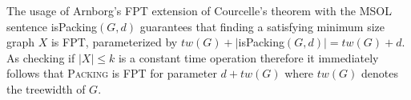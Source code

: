 \documentclass[10pt, a4paper]{article}
\theoremstyle{definition}
\newcommand{\mcO}{\mathcal{O}}
\begin{document}

The usage of Arnborg's FPT extension of Courcelle's theorem with the MSOL sentence isPacking$(G,d)$ guarantees that finding a satisfying minimum size graph $X$ is FPT, parameterized by $tw(G) + |$isPacking$(G,d)| = tw(G) + d$. As checking if $|X| \leq k$ is a constant time operation therefore it immediately follows that \textsc{Packing} is FPT for parameter $d+tw(G)$ where $tw(G)$ denotes the treewidth of $G$.




\end{document}
